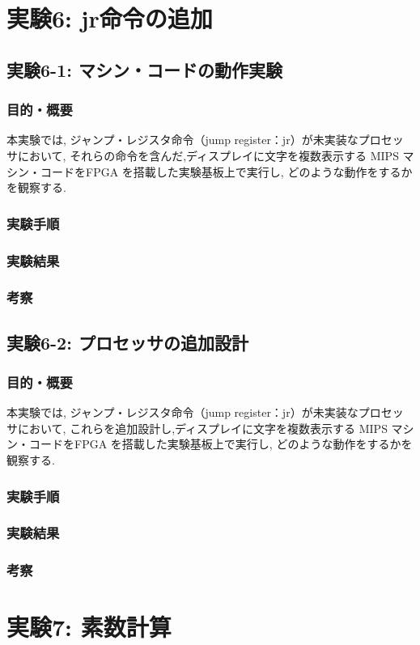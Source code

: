 \documentclass[epsf,a4paper,dvipdfmx,autodetect-engine,titlepage]{jsarticle}
\begin{document}
\section{実験6: jr命令の追加}
\subsection{実験6-1: マシン・コードの動作実験}
\subsubsection{目的・概要}
本実験では, ジャンプ・レジスタ命令（jump register：jr）が未実装なプロセッサにおいて, それらの命令を含んだ,ディスプレイに文字を複数表示する MIPS マシン・コードをFPGA を搭載した実験基板上で実行し, どのような動作をするかを観察する.
\subsubsection{実験手順}
\subsubsection{実験結果}
\subsubsection{考察}
\subsection{実験6-2: プロセッサの追加設計}
\subsubsection{目的・概要}
本実験では, ジャンプ・レジスタ命令（jump register：jr）が未実装なプロセッサにおいて, これらを追加設計し,ディスプレイに文字を複数表示する MIPS マシン・コードをFPGA を搭載した実験基板上で実行し, どのような動作をするかを観察する.
\subsubsection{実験手順}
\subsubsection{実験結果}
\subsubsection{考察}

\section{実験7: 素数計算}
\end{document}
